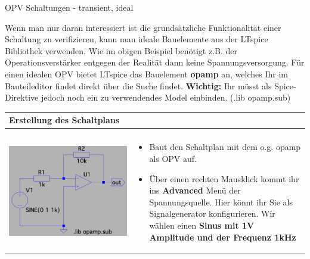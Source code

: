 \begin{frame}[t]{OPV Schaltungen - transient, ideal}
\begin{spacing}{0.6}
\begin{tiny}
  Wenn man nur daran interessiert ist die grundsätzliche Funktionalität einer Schaltung zu verifizieren, kann man ideale
  Bauelemente aus der LTspice Bibliothek verwenden. Wie im obigen Beispiel benötigt z.B. der Operationsverstärker entgegen der Realität dann keine Spannungsversorgung.
  Für einen idealen OPV bietet LTspice das Bauelement \textbf{opamp} an, welches Ihr im Bauteileditor findet direkt über die Suche findet. \newline
  \textbf{Wichtig:} Ihr müsst als Spice-Direktive jedoch noch ein zu verwendendes Model einbinden. (.lib opamp.sub)
    \end{tiny} \end{spacing}
    \begin{spacing}{0.9} \begin{tiny}
    \begin{table}[h!]
      \begin{tabular}{p{3cm} p{7cm}}
        \hline
        \textbf{Erstellung des Schaltplans} & \\
        \hline \\
        \begin{minipage}{.3\textwidth}
          \includegraphics[width=0.8\linewidth]{pictures/opamp_1.png}
        \end{minipage} 
        & 
        \begin{minipage}{.7\textwidth}
        \begin{itemize}
          \item Baut den Schaltplan mit dem o.g. opamp als OPV auf. 
          \item Über einen rechten Mausklick kommt ihr ins \textbf{Advanced} Menü der Spannungsquelle. Hier könnt ihr Sie als Signalgenerator konfigurieren. Wir wählen einen \textbf{Sinus mit 1V Amplitude und der Frequenz 1kHz}

\end{itemize}
\end{minipage}
\end{tabular}
\end{table}
\end{tiny}
\end{spacing}
\end{frame}
